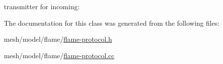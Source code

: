 transmitter for incoming\+: 



The documentation for this class was generated from the following files\+:\begin{DoxyCompactItemize}
\item 
mesh/model/flame/\hyperlink{flame-protocol_8h}{flame-\/protocol.\+h}\item 
mesh/model/flame/\hyperlink{flame-protocol_8cc}{flame-\/protocol.\+cc}\end{DoxyCompactItemize}
